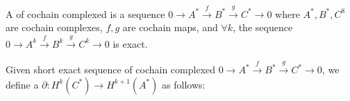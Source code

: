 A  of cochain complexed is a sequence  $ 0\rightarrow A^*\xrightarrow{f}B^*\xrightarrow{g}C^*\rightarrow 0 $ where  $ A^*,B^*,C^8 $ are cochain complexes,  $ f,g $ are cochain maps, and  $ \forall k $, the sequence  $ 0\rightarrow A^k\xrightarrow{f}B^k\xrightarrow{g}C^k\rightarrow 0 $     is exact.
\begin{center}
\end{center}

Given short exact sequence of cochain complexed  $ 0\rightarrow A^*\xrightarrow{f}B^*\xrightarrow{g}C^*\rightarrow 0 $, we define a   $ \partial:H^k(C^*)\rightarrow H^{k+1}(A^*) $ as follows:


